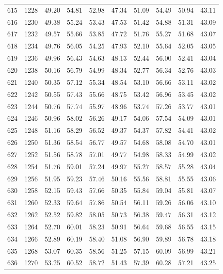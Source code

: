 \begin{longtable}{rrllllllll}
		615 & 1228 & 49.20 & 54.81 & 52.98 & 47.34 & 51.09 & 54.49 & 50.94 & 43.11 \\ 
		616 & 1230 & 49.38 & 55.24 & 53.43 & 47.53 & 51.42 & 54.88 & 51.31 & 43.09 \\ 
		617 & 1232 & 49.57 & 55.66 & 53.85 & 47.72 & 51.76 & 55.27 & 51.68 & 43.07 \\ 
		618 & 1234 & 49.76 & 56.05 & 54.25 & 47.93 & 52.10 & 55.64 & 52.05 & 43.05 \\ 
		619 & 1236 & 49.96 & 56.43 & 54.63 & 48.13 & 52.44 & 56.00 & 52.41 & 43.04 \\ 
		620 & 1238 & 50.16 & 56.79 & 54.99 & 48.34 & 52.77 & 56.34 & 52.76 & 43.03 \\ 
		621 & 1240 & 50.35 & 57.12 & 55.34 & 48.54 & 53.10 & 56.66 & 53.11 & 43.02 \\ 
		622 & 1242 & 50.55 & 57.43 & 55.66 & 48.75 & 53.42 & 56.96 & 53.45 & 43.02 \\ 
		623 & 1244 & 50.76 & 57.74 & 55.97 & 48.96 & 53.74 & 57.26 & 53.77 & 43.01 \\ 
		624 & 1246 & 50.96 & 58.02 & 56.26 & 49.17 & 54.06 & 57.54 & 54.09 & 43.01 \\ 
		625 & 1248 & 51.16 & 58.29 & 56.52 & 49.37 & 54.37 & 57.82 & 54.41 & 43.02 \\ 
		626 & 1250 & 51.36 & 58.54 & 56.77 & 49.57 & 54.68 & 58.08 & 54.70 & 43.01 \\ 
		627 & 1252 & 51.56 & 58.78 & 57.01 & 49.77 & 54.98 & 58.33 & 54.99 & 43.02 \\ 
		628 & 1254 & 51.76 & 59.01 & 57.24 & 49.97 & 55.27 & 58.57 & 55.28 & 43.04 \\ 
		629 & 1256 & 51.95 & 59.23 & 57.46 & 50.16 & 55.56 & 58.81 & 55.55 & 43.06 \\ 
		630 & 1258 & 52.15 & 59.43 & 57.66 & 50.35 & 55.84 & 59.04 & 55.81 & 43.07 \\ 
		631 & 1260 & 52.33 & 59.64 & 57.86 & 50.54 & 56.11 & 59.26 & 56.06 & 43.10 \\ 
		632 & 1262 & 52.52 & 59.82 & 58.05 & 50.73 & 56.38 & 59.47 & 56.31 & 43.12 \\ 
		633 & 1264 & 52.70 & 60.01 & 58.23 & 50.91 & 56.64 & 59.68 & 56.55 & 43.15 \\ 
		634 & 1266 & 52.89 & 60.19 & 58.40 & 51.08 & 56.90 & 59.89 & 56.78 & 43.18 \\ 
		635 & 1268 & 53.07 & 60.35 & 58.56 & 51.25 & 57.15 & 60.09 & 56.99 & 43.21 \\ 
		636 & 1270 & 53.25 & 60.52 & 58.72 & 51.43 & 57.39 & 60.28 & 57.21 & 43.25 \\ 

\end{longtable}
